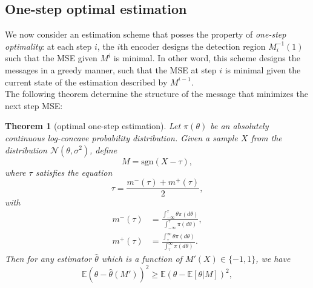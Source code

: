 \documentclass[letterpaper, conference]{IEEEtran}      %
\newtheorem{thm}{\bf{Theorem}}
\newcommand{\sgn}{\mathrm{sgn} }
\begin{document}
\subsection{One-step optimal estimation}
We now consider an estimation scheme that posses the property of \emph{one-step optimality}: at each step $i$, the $i$th encoder designs the detection region $M_i^{-1}(1)$ such that the MSE given $M^i$ is minimal. In other word, this scheme designs the messages in a greedy manner, such that the MSE at step $i$ is minimal given the current state of the estimation described by $M^{i-1}$. \\

The following theorem determine the structure of the message that minimizes the next step MSE:
\begin{thm}[optimal one-step estimation] \label{thm:opt_one_step}
Let $\pi(\theta)$ be an absolutely continuous log-concave probability distribution. Given a sample $X$ from the distribution $\mathcal N(\theta, \sigma^2)$, define 
\begin{equation}
\label{eq:adaptive_main_message}
M = \sgn(X - \tau),
\end{equation}
where $\tau$ satisfies the equation
\begin{equation}
 \label{eq:fixed_point}
 \tau = \frac{m^-(\tau) + m^+(\tau)}{2},
\end{equation}
with
\begin{align*}
m^-(\tau)  & = \frac{\int_{-\infty}^{\tau} \theta \pi(d\theta) }{\int_{-\infty}^{\tau} \pi(d\theta)} ,\\
m^+(\tau) & = \frac{\int_{\tau}^\infty \theta \pi(d\theta) }{\int_{\tau}^\infty \pi(d\theta)} .
\end{align*}
Then for any estimator $\widehat{\theta}$ which is a function of $M'(X) \in \{-1,1\}$, we have
\begin{equation}
\label{eq:opt_cond}
\mathbb E \left(\theta-\widehat{\theta}(M')\right)^2 \geq  \mathbb E \left(\theta- \mathbb E[\theta|M]\right)^2,
\end{equation}
\end{thm}
\end{document}
